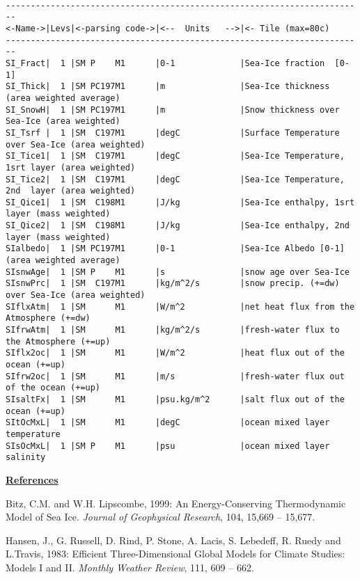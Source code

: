 \begin{verbatim}

------------------------------------------------------------------------
<-Name->|Levs|<-parsing code->|<--  Units   -->|<- Tile (max=80c) 
------------------------------------------------------------------------
SI_Fract|  1 |SM P    M1      |0-1             |Sea-Ice fraction  [0-1]
SI_Thick|  1 |SM PC197M1      |m               |Sea-Ice thickness (area weighted average)
SI_SnowH|  1 |SM PC197M1      |m               |Snow thickness over Sea-Ice (area weighted)
SI_Tsrf |  1 |SM  C197M1      |degC            |Surface Temperature over Sea-Ice (area weighted)
SI_Tice1|  1 |SM  C197M1      |degC            |Sea-Ice Temperature, 1srt layer (area weighted)
SI_Tice2|  1 |SM  C197M1      |degC            |Sea-Ice Temperature, 2nd  layer (area weighted)
SI_Qice1|  1 |SM  C198M1      |J/kg            |Sea-Ice enthalpy, 1srt layer (mass weighted)
SI_Qice2|  1 |SM  C198M1      |J/kg            |Sea-Ice enthalpy, 2nd  layer (mass weighted)
SIalbedo|  1 |SM PC197M1      |0-1             |Sea-Ice Albedo [0-1] (area weighted average)
SIsnwAge|  1 |SM P    M1      |s               |snow age over Sea-Ice
SIsnwPrc|  1 |SM  C197M1      |kg/m^2/s        |snow precip. (+=dw) over Sea-Ice (area weighted)
SIflxAtm|  1 |SM      M1      |W/m^2           |net heat flux from the Atmosphere (+=dw)
SIfrwAtm|  1 |SM      M1      |kg/m^2/s        |fresh-water flux to the Atmosphere (+=up)
SIflx2oc|  1 |SM      M1      |W/m^2           |heat flux out of the ocean (+=up)
SIfrw2oc|  1 |SM      M1      |m/s             |fresh-water flux out of the ocean (+=up)
SIsaltFx|  1 |SM      M1      |psu.kg/m^2      |salt flux out of the ocean (+=up)
SItOcMxL|  1 |SM      M1      |degC            |ocean mixed layer temperature
SIsOcMxL|  1 |SM P    M1      |psu             |ocean mixed layer salinity
\end{verbatim}

\vspace{1cm}

\noindent 
{\bf {\underline{References}}}

\noindent
Bitz, C.M. and W.H. Lipscombe, 1999: An Energy-Conserving
Thermodynamic Model of Sea Ice.
{\it Journal of Geophysical Research}, 104, 15,669 -- 15,677.

\vspace{.2cm}

\noindent
Hansen, J., G. Russell, D. Rind, P. Stone, A. Lacis, S. Lebedeff,
R. Ruedy and L.Travis, 1983: Efficient Three-Dimensional
Global Models for Climate Studies: Models I and II.
{\it Monthly Weather Review}, 111, 609 -- 662.

